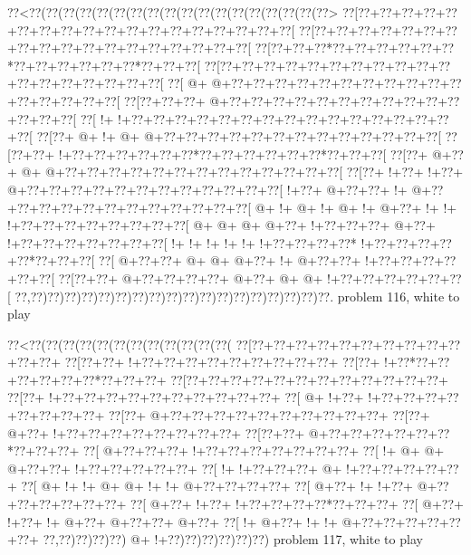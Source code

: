 \vbox{\vbox{\goo
\0??<\0??(\0??(\0??(\0??(\0??(\0??(\0??(\0??(\0??(\0??(\0??(\0??(\0??(\0??(\0??(\0??(\0??(\0??>
\0??[\0??+\0??+\0??+\0??+\0??+\0??+\0??+\0??+\0??+\0??+\0??+\0??+\0??+\0??+\0??+\0??+\0??+\0??[
\0??[\0??+\0??+\0??+\0??+\0??+\0??+\0??+\0??+\0??+\0??+\0??+\0??+\0??+\0??+\0??+\0??+\0??+\0??[
\0??[\0??+\0??+\0??*\0??+\0??+\0??+\0??+\0??+\0??*\0??+\0??+\0??+\0??+\0??+\0??*\0??+\0??+\0??[
\0??[\0??+\0??+\0??+\0??+\0??+\0??+\0??+\0??+\0??+\0??+\0??+\0??+\0??+\0??+\0??+\0??+\0??+\0??[
\0??[\- @+\- @+\0??+\0??+\0??+\0??+\0??+\0??+\0??+\0??+\0??+\0??+\0??+\0??+\0??+\0??+\0??+\0??[
\0??[\0??+\0??+\0??+\- @+\0??+\0??+\0??+\0??+\0??+\0??+\0??+\0??+\0??+\0??+\0??+\0??+\0??+\0??[
\0??[\- !+\- !+\0??+\0??+\0??+\0??+\0??+\0??+\0??+\0??+\0??+\0??+\0??+\0??+\0??+\0??+\0??+\0??[
\0??[\0??+\- @+\- !+\- @+\- @+\0??+\0??+\0??+\0??+\0??+\0??+\0??+\0??+\0??+\0??+\0??+\0??+\0??[
\0??[\0??+\0??+\- !+\0??+\0??+\0??+\0??+\0??+\0??*\0??+\0??+\0??+\0??+\0??+\0??*\0??+\0??+\0??[
\0??[\0??+\- @+\0??+\- @+\- @+\0??+\0??+\0??+\0??+\0??+\0??+\0??+\0??+\0??+\0??+\0??+\0??+\0??[
\0??[\0??+\- !+\0??+\- !+\0??+\- @+\0??+\0??+\0??+\0??+\0??+\0??+\0??+\0??+\0??+\0??+\0??+\0??[
\- !+\0??+\- @+\0??+\0??+\- !+\- @+\0??+\0??+\0??+\0??+\0??+\0??+\0??+\0??+\0??+\0??+\0??+\0??[
\- @+\- !+\- @+\- !+\- @+\- !+\- @+\0??+\- !+\- !+\- !+\0??+\0??+\0??+\0??+\0??+\0??+\0??+\0??[
\- @+\- @+\- @+\- @+\0??+\- !+\0??+\0??+\0??+\- @+\0??+\- !+\0??+\0??+\0??+\0??+\0??+\0??+\0??[
\- !+\- !+\- !+\- !+\- !+\- !+\0??+\0??+\0??+\0??*\- !+\0??+\0??+\0??+\0??+\0??*\0??+\0??+\0??[
\0??[\- @+\0??+\0??+\- @+\- @+\- @+\0??+\- !+\- @+\0??+\0??+\- !+\0??+\0??+\0??+\0??+\0??+\0??[
\0??[\0??+\0??+\- @+\0??+\0??+\0??+\0??+\- @+\0??+\- @+\- @+\- !+\0??+\0??+\0??+\0??+\0??+\0??[
\0??,\0??)\0??)\0??)\0??)\0??)\0??)\0??)\0??)\0??)\0??)\0??)\0??)\0??)\0??)\0??)\0??)\0??)\0??.
}
\hfil problem 116, white to play\hfil\break
}

\vbox{\vbox{\goo
\0??<\0??(\0??(\0??(\0??(\0??(\0??(\0??(\0??(\0??(\0??(\0??(\0??(
\0??[\0??+\0??+\0??+\0??+\0??+\0??+\0??+\0??+\0??+\0??+\0??+\0??+
\0??[\0??+\0??+\- !+\0??+\0??+\0??+\0??+\0??+\0??+\0??+\0??+\0??+
\0??[\0??+\- !+\0??*\0??+\0??+\0??+\0??+\0??+\0??*\0??+\0??+\0??+
\0??[\0??+\0??+\0??+\0??+\0??+\0??+\0??+\0??+\0??+\0??+\0??+\0??+
\0??[\0??+\- !+\0??+\0??+\0??+\0??+\0??+\0??+\0??+\0??+\0??+\0??+
\0??[\- @+\- !+\0??+\- !+\0??+\0??+\0??+\0??+\0??+\0??+\0??+\0??+
\0??[\0??+\- @+\0??+\0??+\0??+\0??+\0??+\0??+\0??+\0??+\0??+\0??+
\0??[\0??+\- @+\0??+\- !+\0??+\0??+\0??+\0??+\0??+\0??+\0??+\0??+
\0??[\0??+\0??+\- @+\0??+\0??+\0??+\0??+\0??+\0??*\0??+\0??+\0??+
\0??[\- @+\0??+\0??+\0??+\- !+\0??+\0??+\0??+\0??+\0??+\0??+\0??+
\0??[\- !+\- @+\- @+\- @+\0??+\0??+\- !+\0??+\0??+\0??+\0??+\0??+
\0??[\- !+\- !+\0??+\0??+\0??+\- @+\- !+\0??+\0??+\0??+\0??+\0??+
\0??[\- @+\- !+\- !+\- @+\- @+\- !+\- !+\- @+\0??+\0??+\0??+\0??+
\0??[\- @+\0??+\- !+\- !+\0??+\- @+\0??+\0??+\0??+\0??+\0??+\0??+
\0??[\- @+\0??+\- !+\0??+\- !+\0??+\0??+\0??+\0??*\0??+\0??+\0??+
\0??[\- @+\0??+\- !+\0??+\- !+\- @+\0??+\- @+\0??+\0??+\- @+\0??+
\0??[\- !+\- @+\0??+\- !+\- !+\- @+\0??+\0??+\0??+\0??+\0??+\0??+
\0??,\0??)\0??)\0??)\0??)\- @+\- !+\0??)\0??)\0??)\0??)\0??)\0??)
}
\hfil problem 117, white to play\hfil\break
}

